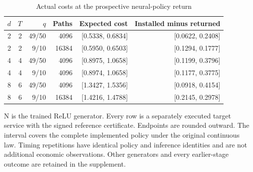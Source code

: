 \begin{table}[htbp]
\centering
\caption{Actual costs at the prospective neural-policy return}\label{tab:economic56}
{\small\setlength{\tabcolsep}{4pt}
\begin{tabular}{rrrrrr}
\toprule
$d$ & $T$ & $q$ & Paths & Expected cost & Installed minus returned \\
\midrule
2 & 2 & 49/50 & 4096 & [0.5338, 0.6834] & [0.0622, 0.2408] \\
2 & 2 & 9/10 & 16384 & [0.5950, 0.6503] & [0.1294, 0.1777] \\
4 & 4 & 49/50 & 4096 & [0.8975, 1.0658] & [0.1199, 0.3796] \\
4 & 4 & 9/10 & 4096 & [0.8974, 1.0658] & [0.1177, 0.3775] \\
8 & 6 & 49/50 & 4096 & [1.3427, 1.5356] & [0.0918, 0.4154] \\
8 & 6 & 9/10 & 16384 & [1.4216, 1.4788] & [0.2145, 0.2978] \\
\bottomrule
\end{tabular}}
\par\smallskip
{\footnotesize N is the trained ReLU generator. Every row is a separately executed target service with the signed reference certificate. Endpoints are rounded outward. The interval covers the complete implemented policy under the original continuous law. Timing repetitions have identical policy and inference identities and are not additional economic observations. Other generators and every earlier-stage outcome are retained in the supplement.}
\end{table}
